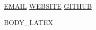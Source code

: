 \documentclass[11pt,a4paper]{article}
\begin{document}
 \\[4pt]
\noindent \href{mailto:{{EMAIL}}}{{{EMAIL}}} \quad \textbullet{} \quad \href{{{WEBSITE}}}{{{WEBSITE}}} \quad \textbullet{} \quad \href{{{GITHUB}}}{{{GITHUB}}}


{{BODY_LATEX}}
\end{document}
